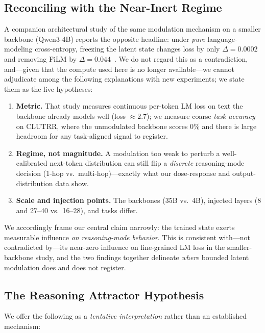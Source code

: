 \documentclass[11pt,a4paper]{article}
\begin{document}
\subsection{Reconciling with the Near-Inert Regime}

A companion architectural study of the same modulation mechanism on a smaller backbone (Qwen3-4B) reports the opposite headline: under \emph{pure} language-modeling cross-entropy, freezing the latent state changes loss by only $\Delta = 0.0002$ and removing FiLM by $\Delta = 0.044$~\cite{plaa}. We do not regard this as a contradiction, and---given that the compute used here is no longer available---we cannot adjudicate among the following explanations with new experiments; we state them as the live hypotheses:

\begin{enumerate}
    \item \textbf{Metric.} That study measures continuous per-token LM loss on text the backbone already models well (loss $\approx 2.7$); we measure coarse \emph{task accuracy} on CLUTRR, where the unmodulated backbone scores $0\%$ and there is large headroom for any task-aligned signal to register.
    \item \textbf{Regime, not magnitude.} A modulation too weak to perturb a well-calibrated next-token distribution can still flip a \emph{discrete} reasoning-mode decision (1-hop vs.\ multi-hop)---exactly what our dose-response and output-distribution data show.
    \item \textbf{Scale and injection points.} The backbones (35B vs.\ 4B), injected layers (8 and 27--40 vs.\ 16--28), and tasks differ.
\end{enumerate}

We accordingly frame our central claim narrowly: the trained state exerts measurable influence \emph{on reasoning-mode behavior}. This is consistent with---not contradicted by---its near-zero influence on fine-grained LM loss in the smaller-backbone study, and the two findings together delineate \emph{where} bounded latent modulation does and does not register.

\subsection{The Reasoning Attractor Hypothesis}
\label{sec:attractor}

We offer the following as a \textit{tentative interpretation} rather than an established mechanism:
\end{document}
